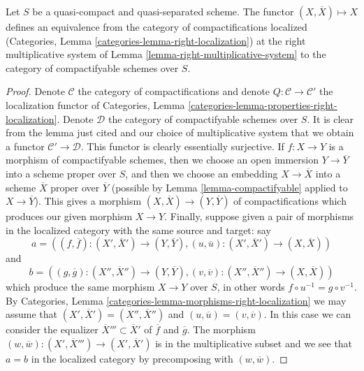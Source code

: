 \begin{lemma}
\label{lemma-invert-right-multiplicative-system}
Let $S$ be a quasi-compact and quasi-separated scheme.
The functor $(X, \overline{X}) \mapsto X$ defines an
equivalence from the category of compactifications localized
(Categories, Lemma \ref{categories-lemma-right-localization})
at the right
multiplicative system of Lemma \ref{lemma-right-multiplicative-system}
to the category of compactifyable schemes over $S$.
\end{lemma}

\begin{proof}
Denote $\mathcal{C}$ the category of compactifications and
denote $Q : \mathcal{C} \to \mathcal{C}'$ the localization
functor of Categories, Lemma
\ref{categories-lemma-properties-right-localization}.
Denote $\mathcal{D}$ the category of compactifyable schemes
over $S$. It is clear from the lemma just cited and our
choice of multiplicative system that we
obtain a functor $\mathcal{C}' \to \mathcal{D}$.
This functor is clearly essentially surjective.
If $f : X \to Y$ is a morphism of compactifyable
schemes, then we choose an open immersion $Y \to \overline{Y}$
into a scheme proper over $S$, and then we choose an embedding
$X \to \overline{X}$ into a scheme $\overline{X}$ proper over
$\overline{Y}$ (possible by Lemma \ref{lemma-compactifyable}
applied to $X \to \overline{Y}$). This gives a morphism
$(X, \overline{X}) \to (Y, \overline{Y})$ of compactifications
which produces our given morphism $X \to Y$.
Finally, suppose given a pair of morphisms in the
localized category with the same source and target: say
$$
a = ((f, \overline{f}) : (X', \overline{X}') \to (Y, \overline{Y}),
(u, \overline{u}) : (X', \overline{X}') \to (X, \overline{X}))
$$
and
$$
b = ((g, \overline{g}) : (X'', \overline{X}'') \to (Y, \overline{Y}),
(v, \overline{v}) : (X'', \overline{X}'') \to (X, \overline{X}))
$$
which produce the same morphism $X \to Y$ over $S$, in other words
$f \circ u^{-1} = g \circ v^{-1}$. By
Categories, Lemma \ref{categories-lemma-morphisms-right-localization}
we may assume that $(X', \overline{X}') = (X'', \overline{X}'')$
and $(u, \overline{u}) = (v, \overline{v})$. In this case we
can consider the equalizer $\overline{X}''' \subset \overline{X}'$
of $\overline{f}$ and $\overline{g}$. The morphism
$(w, \overline{w}) : (X', \overline{X}''') \to (X', \overline{X}')$ is in
the multiplicative subset and we see that $a = b$ in the localized
category by precomposing with $(w, \overline{w})$.
\end{proof}







